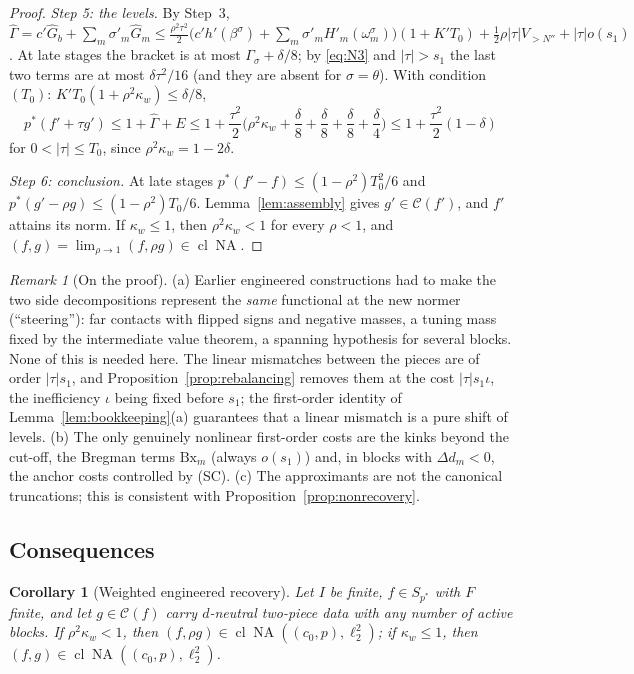 \documentclass[10pt]{amsart}
\newtheorem{corollary}[theorem]{Corollary}
\theoremstyle{definition}
\theoremstyle{remark}
\newtheorem{remark}[theorem]{Remark}
\newcommand{\NA}{\operatorname{NA}}
\newcommand{\Cset}{\mathcal C}
\newcommand{\cl}{\operatorname{cl}}
\begin{document}
\begin{proof}
\emph{Step 5: the levels.}  By Step~3,
$\hat\Gamma=c'\hat G_b+\sum_m\sigma'_m\hat G_m\le\frac{\rho^2\tau^2}2
\big(c'h'(\beta^\sigma)+\sum_m\sigma'_mH'_m(\omega^\sigma_m)\big)(1+K'T_0)
+\frac12\rho|\tau|V_{>N''}+|\tau|o(s_1)$.  At late stages the bracket is at
most $\Gamma_\sigma+\delta/8$; by \eqref{eq:N3} and $|\tau|>s_1$ the last two
terms are at most $\delta\tau^2/16$ (and they are absent for
$\sigma=\theta$).  With condition $(T_0)$: $K'T_0(1+\rho^2\kappa_w)\le\delta/8$,
\[
 p^*(f'+\tau g')\le1+\hat\Gamma+E\le1+\frac{\tau^2}2\Big(\rho^2\kappa_w+
 \frac\delta8+\frac\delta8+\frac\delta8+\frac\delta4\Big)\le1+\frac{\tau^2}2
 (1-\delta)
\]
for $0<|\tau|\le T_0$, since $\rho^2\kappa_w=1-2\delta$.

\emph{Step 6: conclusion.}  At late stages $p^*(f'-f)\le(1-\rho^2)T_0^2/6$
and $p^*(g'-\rho g)\le(1-\rho^2)T_0/6$.  Lemma~\ref{lem:assembly} gives
$g'\in\Cset(f')$, and $f'$ attains its norm.  If $\kappa_w\le1$, then
$\rho^2\kappa_w<1$ for every $\rho<1$, and $(f,g)=\lim_{\rho\to1}(f,\rho g)
\in\cl\NA$.
\end{proof}

\begin{remark}[On the proof]\label{rem:engineeredproof}
(a) Earlier engineered constructions had to make the two side
decompositions represent the \emph{same} functional at the new normer
\textup{(}``steering''\textup{)}: far contacts with flipped signs and negative
masses, a tuning mass fixed by the intermediate value theorem, a spanning
hypothesis for several blocks.  None of this is needed here.  The linear
mismatches between the pieces are of order $|\tau|s_1$, and
Proposition~\ref{prop:rebalancing} removes them at the cost
$|\tau|s_1\iota$, the inefficiency $\iota$ being fixed before $s_1$; the
first-order identity of Lemma~\ref{lem:bookkeeping}(a) guarantees that a
linear mismatch is a pure shift of levels.
(b) The only genuinely nonlinear first-order costs are the kinks beyond the
cut-off, the Bregman terms $\mathrm{Bx}_m$ (always $o(s_1)$) and, in blocks
with $\Delta d_m<0$, the anchor costs controlled by \textup{(SC)}.
(c) The approximants are not the canonical truncations; this is consistent
with Proposition~\ref{prop:nonrecovery}.
\end{remark}

\subsection{Consequences}

\begin{corollary}[Weighted engineered recovery]\label{cor:weightedengineered}
Let $I$ be finite, $f\in S_{p^*}$ with $F$ finite, and let $g\in\Cset(f)$
carry $d$-neutral two-piece data with any number of active blocks.  If
$\rho^2\kappa_w<1$, then $(f,\rho g)\in\cl\NA((c_0,p),\ell_2^2)$; if
$\kappa_w\le1$, then $(f,g)\in\cl\NA((c_0,p),\ell_2^2)$.
\end{corollary}
\end{document}
